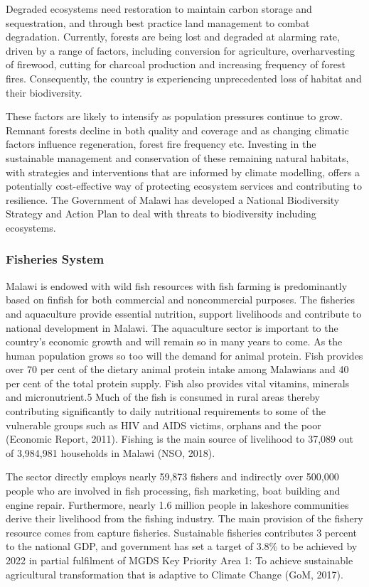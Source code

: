\documentclass[
]{book}
\begin{document}
Degraded ecosystems need restoration to maintain carbon storage and sequestration, and through best practice land management to combat degradation. Currently,
forests are being lost and degraded at alarming rate, driven by a range of factors, including conversion for agriculture, overharvesting of firewood, cutting for
charcoal production and increasing frequency of forest fires. Consequently, the country is experiencing unprecedented loss of habitat and their biodiversity.

These factors are likely to intensify as population pressures continue to grow. Remnant forests decline in both quality and coverage and as changing climatic
factors influence regeneration, forest fire frequency etc. Investing in the sustainable management and conservation of these remaining natural habitats, with
strategies and interventions that are informed by climate modelling, offers a potentially cost-effective way of protecting ecosystem services and contributing to
resilience. The Government of Malawi has developed a National Biodiversity Strategy and Action Plan to deal with threats to biodiversity including ecosystems.

\hypertarget{fisheries-system}{%
\subsubsection{Fisheries System}\label{fisheries-system}}

Malawi is endowed with wild fish resources with fish farming is predominantly based on finfish for both commercial and noncommercial purposes. The fisheries and
aquaculture provide essential nutrition, support livelihoods and contribute to national development in Malawi. The aquaculture sector is important to the
country's economic growth and will remain so in many years to come. As the human population grows so too will the demand for animal protein. Fish provides over
70 per cent of the dietary animal protein intake among Malawians and 40 per cent of the total protein supply. Fish also provides vital vitamins, minerals and
micronutrient.5 Much of the fish is consumed in rural areas thereby contributing significantly to daily nutritional requirements to some of the vulnerable groups
such as HIV and AIDS victims, orphans and the poor (Economic Report, 2011). Fishing is the main source of livelihood to 37,089 out of 3,984,981 households in
Malawi (NSO, 2018).

The sector directly employs nearly 59,873 fishers and indirectly over 500,000 people who are involved in fish processing, fish marketing, boat building and
engine repair. Furthermore, nearly 1.6 million people in lakeshore communities derive their livelihood from the fishing industry. The main provision of the
fishery resource comes from capture fisheries. Sustainable fisheries contributes 3 percent to the national GDP, and government has set a target of 3.8\% to be
achieved by 2022 in partial fulfilment of MGDS Key Priority Area 1: To achieve sustainable agricultural transformation that is adaptive to Climate Change (GoM,
2017).
\end{document}

